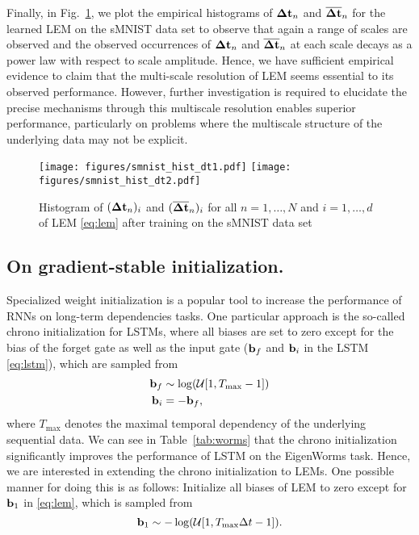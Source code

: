 \documentclass{article} \usepackage{iclr2022_conference,times}
\newcommand{\bb}{{\bf b}}
\newcommand{\Dt}{{\Delta t}}
\newcommand{\fref}[1] {Fig.~\ref{#1}}
\newcommand{\Tref}[1]{Table~\ref{#1}}
\begin{document}
Finally, in \fref{fig:hist1}, we plot the empirical histograms of ${\bf \Dt}_n$ and ${\bf \overline{\Dt}}_n$ for the learned LEM on the sMNIST data set to observe that again a range of scales are observed and the observed occurrences of ${\bf \Dt}_n$ and ${\bf \overline{\Dt}}_n$ at each scale decays as a power law with respect to scale amplitude. Hence, we have sufficient empirical evidence to claim that the multi-scale resolution of LEM seems essential to its observed performance. However, further investigation is required to elucidate the precise mechanisms through this multiscale resolution enables superior performance, particularly on problems where the multiscale structure of the underlying data may not be explicit. 
\begin{figure}[ht!]
\centering
\texttt{[image: figures/smnist\_hist\_dt1.pdf]}
\texttt{[image: figures/smnist\_hist\_dt2.pdf]}
\caption{Histogram of $({\bf \Dt}_n)_i$ and $({\bf \overline{\Dt}}_n)_i$ for all $n=1,\dots,N$ and $i=1,\dots,d$ of LEM \eqref{eq:lem} after training on the sMNIST data set}
\label{fig:hist1}
\end{figure}
\subsection{On gradient-stable initialization.}
\label{sec:chrono}
Specialized weight initialization is a popular tool to increase the performance of RNNs on long-term dependencies tasks. One particular approach is the so-called chrono initialization \citep{warp} for LSTMs, where all biases are set to zero except for the bias of the forget gate as well as the input gate ($\bb_f$ and $\bb_i$ in the LSTM \eqref{eq:lstm}), which are sampled from
\begin{align*}
    \bb_f &\sim \log(\mathcal{U}[1,T_{\text{max}}-1]) \\
    \bb_i &= - \bb_f,
\end{align*}
where $T_{\text{max}}$ denotes the maximal temporal dependency of the underlying sequential data.
We can see in \Tref{tab:worms} that the chrono initialization significantly improves the performance of LSTM on the EigenWorms task. Hence, we are interested in extending the chrono initialization to LEMs. One possible manner for doing this is as follows: Initialize all biases of LEM to zero except for $\bb_1$ in \eqref{eq:lem}, which is sampled from
\begin{equation*}
    \bb_1 \sim -\log(\mathcal{U}[1,T_{\text{max}}\Dt-1]).
\end{equation*}
\end{document}
